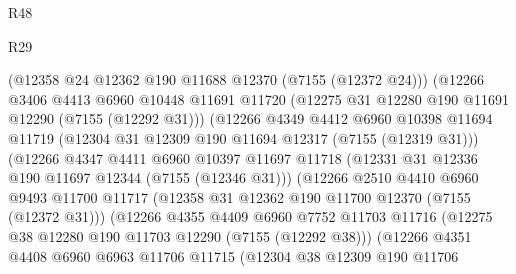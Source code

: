 \begin{lexlean}{R48}
\begin{lexlean}{R29}
\begin{coremodule}
{{{{{{{{{{{{{{{{{{{{{{{{{{{{{{{{{{{{{{{{{{{{{{{{{{{{{{{{{{{{{{{{{{{{{{{{{{{{{{{{{{{{{{{{{{{{{{{{{{{{{{{{{{{{{{{{{{{{{{{{{{{{{{{{{{{{{{{{{{{{{{{{{{{{{{{{{{{{{{{{{{{{{{{{{{{{{{{{{{{{{{{{{{{{{{{{{{{{{{{{{{{{{{{{{{{{{{{{{{                              (@12358 @24 @12362 @190 @11688 @12370 (@7155 (@12372 @24)))
                              (@12266
                                @3406
                                @4413
                                @6960
                                @10448
                                @11691
                                @11720
                                (@12275 @31 @12280 @190 @11691 @12290 (@7155 (@12292 @31)))
                                (@12266
                                  @4349
                                  @4412
                                  @6960
                                  @10398
                                  @11694
                                  @11719
                                  (@12304 @31 @12309 @190 @11694 @12317 (@7155 (@12319 @31)))
                                  (@12266
                                    @4347
                                    @4411
                                    @6960
                                    @10397
                                    @11697
                                    @11718
                                    (@12331 @31 @12336 @190 @11697 @12344 (@7155 (@12346 @31)))
                                    (@12266
                                      @2510
                                      @4410
                                      @6960
                                      @9493
                                      @11700
                                      @11717
                                      (@12358 @31 @12362 @190 @11700 @12370 (@7155 (@12372 @31)))
                                      (@12266
                                        @4355
                                        @4409
                                        @6960
                                        @7752
                                        @11703
                                        @11716
                                        (@12275 @38 @12280 @190 @11703 @12290 (@7155 (@12292 @38)))
                                        (@12266
                                          @4351
                                          @4408
                                          @6960
                                          @6963
                                          @11706
                                          @11715
                                          (@12304
                                            @38
                                            @12309
                                            @190
                                            @11706
}}}}}}}}}}}}}}}}}}}}}}}}}}}}}}}}}}}}}}}}}}}}}}}}}}}}}}}}}}}}}}}}}}}}}}}}}}}}}}}}}}}}}}}}}}}}}}}}}}}}}}}}}}}}}}}}}}}}}}}}}}}}}}}}}}}}}}}}}}}}}}}}}}}}}}}}}}}}}}}}}}}}}}}}}}}}}}}}}}}}}}}}}}}}}}}}}}}}}}}}}}}}}}}}}}}}}}}}}}
\end{coremodule}
\end{lexlean}
\end{lexlean}

